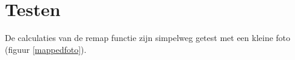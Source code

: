 \section{Testen}
De calculaties van de remap functie zijn simpelweg getest met een kleine foto (figuur \ref{mappedfoto}).
